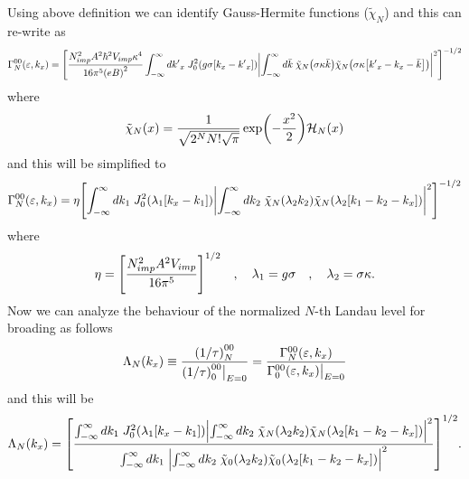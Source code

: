 \noindent
Using above definition we can identify Gauss-Hermite functions ($\tilde{\chi}_N$) and this can re-write as
\begin{equation} \label{5.11}
  \begin{aligned}
    \Gamma^{00}_{N}(\varepsilon,k_x)  =
    \qty[
    \frac { N_{imp}^2 A^2 \hbar^2 V_{imp} \kappa^4}{16\pi^5 \qty(eB)^2}
    \int_{-\infty}^{\infty} d {k'}_x \;
    J_0^2\qty(g\sigma[{k}_x - {k'}_x])
    \qty|
    \int_{-\infty}^{\infty} d\bar{k} \;
    \tilde{\chi}_{N}\qty(\sigma\kappa\bar{k})
    \tilde{\chi}_{N}\qty(\sigma\kappa\qty[{k'}_x - {k}_x - \bar{k}])|^2
    ]^{-1/2}
  \end{aligned}
\end{equation}
where
\begin{equation} \label{5.12}
  \tilde{\chi}_N(x) = \frac{1}{\sqrt{2^{N}N!\sqrt{\pi}}}
  \exp(-\frac{x^2}{2})
  \mathcal{H}_N\qty(x)
\end{equation}
and this will be simplified to
\begin{equation} \label{5.13}
  \begin{aligned}
    \Gamma^{00}_{N}(\varepsilon,k_x)  =
    \eta
    \qty[
    \int_{-\infty}^{\infty} d {k}_1 \;
    J_0^2\qty(\lambda_1[{k}_x - {k}_1])
    \qty|
    \int_{-\infty}^{\infty} d{k}_2 \;
    \tilde{\chi}_{N}\qty(\lambda_2 k_2)
    \tilde{\chi}_{N}\qty(\lambda_2 \qty[{k}_1 - {k}_2 - {k}_x])|^2
    ]^{-1/2}
  \end{aligned}
\end{equation}
where
\begin{equation} \label{5.14}
    \eta = \qty[\frac { N_{imp}^2 A^2 V_{imp}}{16\pi^5}]^{1/2} \quad,\quad
    \lambda_1 = g\sigma \quad,\quad
    \lambda_2 = \sigma \kappa.
\end{equation}
\noindent
Now we can analyze the behaviour of the normalized $N$-th Landau level for broading as follows
\begin{equation} \label{5.15}
    \Lambda_N(k_x) \equiv
    \frac{\qty(1/\tau)^{00}_{N}}{\qty(1/\tau)^{00}_{0}\big|_{E=0}} =
    \frac{\Gamma^{00}_{N}(\varepsilon,k_x)}{\Gamma^{00}_{0}(\varepsilon,k_x)\big|_{E=0}}
\end{equation}
and this will be
\begin{equation} \label{5.16}
    \Lambda_N (k_x) =
    \qty[
    \frac
    {\int_{-\infty}^{\infty} d {k}_1 \;
    J_0^2\qty(\lambda_1[{k}_x - {k}_1])
    \qty|
    \int_{-\infty}^{\infty} d{k}_2 \;
    \tilde{\chi}_{N}\qty(\lambda_2 k_2)
    \tilde{\chi}_{N}\qty(\lambda_2 \qty[{k}_1 - {k}_2 - {k}_x])|^2}
    {\int_{-\infty}^{\infty} d {k}_1 \;
    \qty|
    \int_{-\infty}^{\infty} d{k}_2 \;
    \tilde{\chi}_{0}\qty(\lambda_2 k_2)
    \tilde{\chi}_{0}\qty(\lambda_2 \qty[{k}_1 - {k}_2 - {k}_x])|^2}
    ]^{1/2}.
\end{equation}

